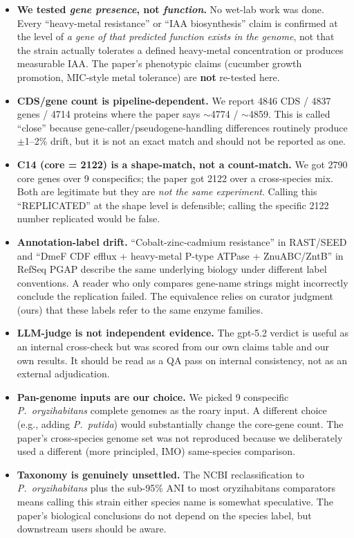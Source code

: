 \documentclass[11pt]{article}
\begin{document}
\begin{itemize}[leftmargin=*]
\item \textbf{We tested \emph{gene presence}, not \emph{function}.} No wet-lab
work was done. Every ``heavy-metal resistance'' or ``IAA biosynthesis'' claim
is confirmed at the level of \emph{a gene of that predicted function exists
in the genome}, not that the strain actually tolerates a defined heavy-metal
concentration or produces measurable IAA. The paper's phenotypic claims
(cucumber growth promotion, MIC-style metal tolerance) are \textbf{not}
re-tested here.
\item \textbf{CDS/gene count is pipeline-dependent.} We report 4846 CDS /
4837 genes / 4714 proteins where the paper says $\sim$4774 / $\sim$4859. This
is called ``close'' because gene-caller/pseudogene-handling differences
routinely produce $\pm$1--2\% drift, but it is not an exact match and should
not be reported as one.
\item \textbf{C14 (core = 2122) is a shape-match, not a count-match.} We got
2790 core genes over 9 conspecifics; the paper got 2122 over a cross-species
mix. Both are legitimate but they are \emph{not the same experiment}. Calling
this ``REPLICATED'' at the shape level is defensible; calling the specific
2122 number replicated would be false.
\item \textbf{Annotation-label drift.} ``Cobalt-zinc-cadmium resistance'' in
RAST/SEED and ``DmeF CDF efflux + heavy-metal P-type ATPase + ZnuABC/ZntB'' in
RefSeq PGAP describe the same underlying biology under different label
conventions. A reader who only compares gene-name strings might incorrectly
conclude the replication failed. The equivalence relies on curator judgment
(ours) that these labels refer to the same enzyme families.
\item \textbf{LLM-judge is not independent evidence.} The gpt-5.2 verdict is
useful as an internal cross-check but was scored from our own claims table and
our own results. It should be read as a QA pass on internal consistency, not
as an external adjudication.
\item \textbf{Pan-genome inputs are our choice.} We picked 9 conspecific
\textit{P.\ oryzihabitans} complete genomes as the roary input. A different
choice (e.g., adding \textit{P.\ putida}) would substantially change the
core-gene count. The paper's cross-species genome set was not reproduced
because we deliberately used a different (more principled, IMO) same-species
comparison.
\item \textbf{Taxonomy is genuinely unsettled.} The NCBI reclassification to
\textit{P.\ oryzihabitans} plus the sub-95\% ANI to most oryzihabitans
comparators means calling this strain either species name is somewhat
speculative. The paper's biological conclusions do not depend on the species
label, but downstream users should be aware.
\end{itemize}
\end{document}
